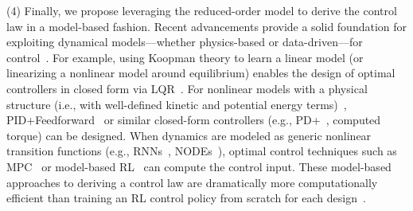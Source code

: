 %
(4) Finally, we propose leveraging the reduced-order model to derive the control law in a model-based fashion. Recent advancements provide a solid foundation for exploiting dynamical models—whether physics-based or data-driven—for control~\citep{della2023model, laschi2023learning}. For example, using Koopman theory to learn a linear model (or linearizing a nonlinear model around equilibrium) enables the design of optimal controllers in closed form via LQR~\citep{bruder2020data}. For nonlinear models with a physical structure (i.e., with well-defined kinetic and potential energy terms)~\citep{armanini2023soft, liu2024physics, stolzle2024input, alkayas2025soft, valadas2025learning}, PID+Feedforward~\citep{della2023model, stolzle2024experimental, stolzle2024input} or similar closed-form controllers (e.g., PD+~\citep{della2020model}, computed torque) can be designed. When dynamics are modeled as generic nonlinear transition functions (e.g., \glspl{RNN}~\citep{thuruthel2017learning}, \glspl{NODE}~\citep{kasaei2023data}), optimal control techniques such as \gls{MPC}~\citep{alora2023data} or model-based \gls{RL}~\citep{thuruthel2018model} can compute the control input. These model-based approaches to deriving a control law are dramatically more computationally efficient than training an \gls{RL} control policy from scratch for each design~\citep{bhatia2021evolution, wang2022curriculum, wang2023softzoo, wang2023preco}.

